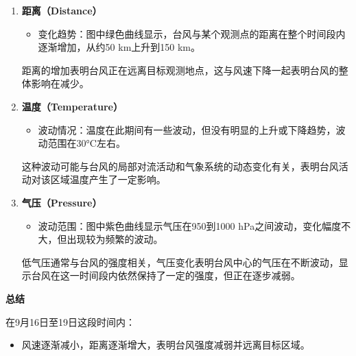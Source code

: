 \documentclass[withoutpreface,bwprint]{cumcmthesis}
\begin{document}
\begin{enumerate}
\begin{enumerate}
            这表明台风在此期间逐渐减弱。风速的降低反映了台风能量的逐步耗散，可能是由于进入陆地或失去海洋的热能供给。

            \item[(b)] \textbf{距离（Distance）}

            \begin{itemize}
                \item 变化趋势：图中绿色曲线显示，台风与某个观测点的距离在整个时间段内逐渐增加，从约50 km上升到150 km。

            \end{itemize}

            距离的增加表明台风正在远离目标观测地点，这与风速下降一起表明台风的整体影响在减少。

            \item[(c)] \textbf{温度（Temperature）}

            \begin{itemize}
            
                \item 波动情况：温度在此期间有一些波动，但没有明显的上升或下降趋势，波动范围在30°C左右。
                
            \end{itemize}
            
            这种波动可能与台风的局部对流活动和气象系统的动态变化有关，表明台风活动对该区域温度产生了一定影响。

            \item[(d)] \textbf{气压（Pressure）}

            \begin{itemize}
            
                \item 波动范围：图中紫色曲线显示气压在950到1000 hPa之间波动，变化幅度不大，但出现较为频繁的波动。
                
            \end{itemize}
            
            低气压通常与台风的强度相关，气压变化表明台风中心的气压在不断波动，显示台风在这一时间段内依然保持了一定的强度，但正在逐步减弱。            
        \end{enumerate}

            \vspace{1em}
            \textbf{总结}

            在9月16日至19日这段时间内：

        \begin{itemize}
                \item 风速逐渐减小，距离逐渐增大，表明台风强度减弱并远离目标区域。


\end{itemize}
\end{enumerate}
\end{document}
